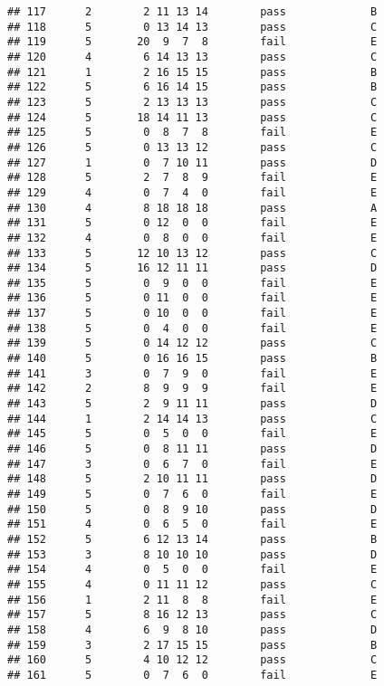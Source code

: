 \documentclass[
]{article}
\begin{document}
\begin{verbatim}
## 117      2        2 11 13 14        pass             B
## 118      5        0 13 14 13        pass             C
## 119      5       20  9  7  8        fail             E
## 120      4        6 14 13 13        pass             C
## 121      1        2 16 15 15        pass             B
## 122      5        6 16 14 15        pass             B
## 123      5        2 13 13 13        pass             C
## 124      5       18 14 11 13        pass             C
## 125      5        0  8  7  8        fail             E
## 126      5        0 13 13 12        pass             C
## 127      1        0  7 10 11        pass             D
## 128      5        2  7  8  9        fail             E
## 129      4        0  7  4  0        fail             E
## 130      4        8 18 18 18        pass             A
## 131      5        0 12  0  0        fail             E
## 132      4        0  8  0  0        fail             E
## 133      5       12 10 13 12        pass             C
## 134      5       16 12 11 11        pass             D
## 135      5        0  9  0  0        fail             E
## 136      5        0 11  0  0        fail             E
## 137      5        0 10  0  0        fail             E
## 138      5        0  4  0  0        fail             E
## 139      5        0 14 12 12        pass             C
## 140      5        0 16 16 15        pass             B
## 141      3        0  7  9  0        fail             E
## 142      2        8  9  9  9        fail             E
## 143      5        2  9 11 11        pass             D
## 144      1        2 14 14 13        pass             C
## 145      5        0  5  0  0        fail             E
## 146      5        0  8 11 11        pass             D
## 147      3        0  6  7  0        fail             E
## 148      5        2 10 11 11        pass             D
## 149      5        0  7  6  0        fail             E
## 150      5        0  8  9 10        pass             D
## 151      4        0  6  5  0        fail             E
## 152      5        6 12 13 14        pass             B
## 153      3        8 10 10 10        pass             D
## 154      4        0  5  0  0        fail             E
## 155      4        0 11 11 12        pass             C
## 156      1        2 11  8  8        fail             E
## 157      5        8 16 12 13        pass             C
## 158      4        6  9  8 10        pass             D
## 159      3        2 17 15 15        pass             B
## 160      5        4 10 12 12        pass             C
## 161      5        0  7  6  0        fail             E

\end{verbatim}
\end{document}
